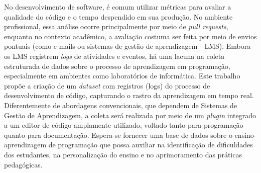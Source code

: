 
\begin{resumoutfpr}%
No desenvolvimento de software, é comum utilizar métricas para avaliar a qualidade do código e o tempo 
despendido em sua produção. 
No ambiente profissional, essa análise ocorre principalmente por meio de \textit{pull requests}, enquanto no 
contexto acadêmico, a avaliação costuma ser feita por meio de envios pontuais (como e-mails ou sistemas de 
gestão de aprendizagem - LMS). Embora os LMS registrem \textit{logs }de atividades e eventos, há uma lacuna na 
coleta estruturada de dados sobre o processo de aprendizagem em programação, especialmente em ambientes como 
laboratórios de informática.
Este trabalho propõe a criação de um \textit{dataset} com registros (logs) do processo de desenvolvimento de 
código, capturando o rastro da aprendizagem em tempo real. Diferentemente de abordagens convencionais, que 
dependem de Sistemas de Gestão de Aprendizagem, a coleta será realizada por meio de um \textit{plugin} 
integrado a um editor de código amplamente utilizado, voltado tanto para programação quanto para documentação. 
Espera-se fornecer uma base de dados sobre o ensino-aprendizagem de programação que possa auxiliar na 
identificação de dificuldades dos estudantes, na personalização do ensino e no aprimoramento das práticas 
pedagógicas.
\end{resumoutfpr}

